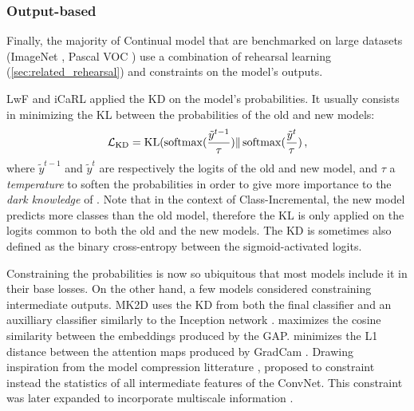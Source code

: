 \subsubsection{Output-based}
\label{sec:related_regul_output}

Finally, the majority of Continual model that are benchmarked on large datasets (\eg ImageNet
\citep{deng2009imagenet}, Pascal VOC \citep{everingham2015pascalvoc}) use a combination of rehearsal
learning (\autoref{sec:related_rehearsal}) and constraints on the model's outputs.

LwF \cite{li2018lwf} and iCaRL applied the \ac{KD} \cite{hinton2015knowledge_distillation} on the
model's probabilities. It usually consists in minimizing the \ac{KL} between the probabilities
of the old and new models:
%
\begin{equation}
    \mathcal{L}_\text{KD} = \operatorname{KL}(\operatorname{softmax}(\frac{\tilde{y}^{t-1}}{\tau}) \Vert \operatorname{softmax}(\frac{\tilde{y}^t}{\tau})\,,
\end{equation}
%
where $\tilde{y}^{t-1}$ and $\tilde{y}^{t}$ are respectively the logits of the old and new model,
and $\tau$ a \textit{temperature} to soften the probabilities in order to give more importance to
the \textit{dark knowledge} of \cite{hinton2015knowledge_distillation}. Note that in the context of
Class-Incremental, the new model predicts more classes than the old model, therefore the \ac{KL} is
only applied on the logits common to both the old and the new models. The \ac{KD} is sometimes also
defined as the binary cross-entropy between the sigmoid-activated logits.

Constraining the probabilities is now so ubiquitous that most models include it in their base
losses. On the other hand, a few models considered constraining intermediate outputs. MK2D
\citep{peng2019m2kd} uses the \ac{KD} from both the final classifier and an auxilliary classifier
similarly to the Inception network \citep{szegedy2015inception}. \cite{hou2019ucir} maximizes the
cosine similarity between the embeddings produced by the \ac{GAP}.
\cite{dhar2019learning_without_memorizing_gradcam} minimizes the L1 distance between the attention
maps produced by GradCam \citep{selvaraju2017gradcam}. Drawing inspiration from the model
compression litterature \cite{zagoruyko2016distillation_attention}, \cite{douillard2020podnet}
proposed to constraint instead the statistics of all intermediate features of the \ac{ConvNet}. This
constraint was later expanded to incorporate multiscale information \cite{douillard2020plop}.

